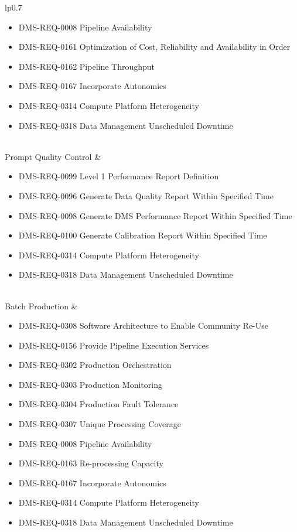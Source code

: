 \begin{xtabular}{lp{0.7\textwidth}}
\begin{itemize}
\item DMS-REQ-0008 Pipeline Availability
\item DMS-REQ-0161 Optimization of Cost, Reliability and Availability in Order
\item DMS-REQ-0162 Pipeline Throughput
\item DMS-REQ-0167 Incorporate Autonomics
\item DMS-REQ-0314 Compute Platform Heterogeneity
\item DMS-REQ-0318 Data Management Unscheduled Downtime
\end{itemize} \\ \hline
Prompt Quality Control &
\begin{itemize}DMS-REQ-0097 Level 1 Data Quality Report Definition
\item DMS-REQ-0099 Level 1 Performance Report Definition
\item DMS-REQ-0096 Generate Data Quality Report Within Specified Time
\item DMS-REQ-0098 Generate DMS Performance Report Within Specified Time
\item DMS-REQ-0100 Generate Calibration Report Within Specified Time
\item DMS-REQ-0314 Compute Platform Heterogeneity
\item DMS-REQ-0318 Data Management Unscheduled Downtime
\end{itemize} \\ \hline
Batch Production &
\begin{itemize}DMS-REQ-0294 Processing of Datasets
\item DMS-REQ-0308 Software Architecture to Enable Community Re-Use
\item DMS-REQ-0156 Provide Pipeline Execution Services
\item DMS-REQ-0302 Production Orchestration
\item DMS-REQ-0303 Production Monitoring
\item DMS-REQ-0304 Production Fault Tolerance
\item DMS-REQ-0307 Unique Processing Coverage
\item DMS-REQ-0008 Pipeline Availability
\item DMS-REQ-0163 Re-processing Capacity
\item DMS-REQ-0167 Incorporate Autonomics
\item DMS-REQ-0314 Compute Platform Heterogeneity
\item DMS-REQ-0318 Data Management Unscheduled Downtime
\end{itemize} \\ \hline

\end{xtabular}
